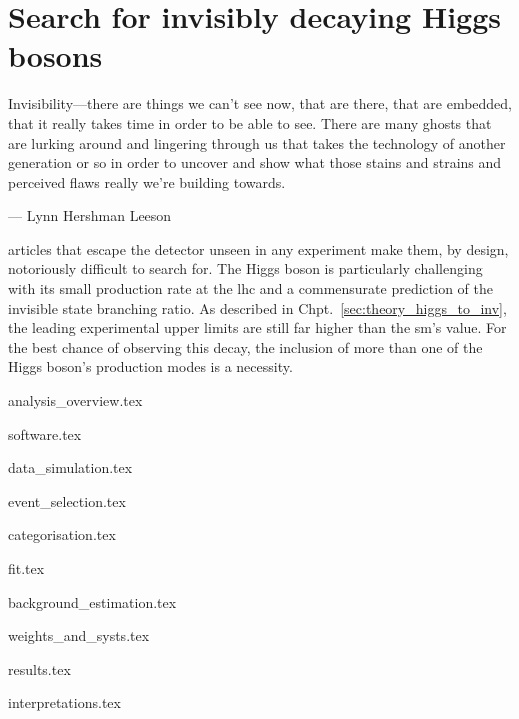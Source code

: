 \chapter{Search for invisibly decaying Higgs bosons}
\label{chap:higgstoinv}

\epigraph{Invisibility---there are things we can't see now, that are there, that are embedded, that it really takes time in order to be able to see. There are many ghosts that are lurking around and lingering through us that takes the technology of another generation or so in order to uncover and show what those stains and strains and perceived flaws really we're building towards.}{--- Lynn Hershman Leeson}

articles that escape the detector unseen in any experiment make them, by design, notoriously difficult to search for. The Higgs boson is particularly challenging with its small production rate at the \acrshort{lhc} and a commensurate prediction of the invisible state branching ratio. As described in Chpt.~\ref{sec:theory_higgs_to_inv}, the leading experimental upper limits are still far higher than the \acrlong{sm}'s value. For the best chance of observing this decay, the inclusion of more than one of the Higgs boson's production modes is a necessity.




{analysis_overview.tex}




{software.tex}




{data_simulation.tex}




{event_selection.tex}




{categorisation.tex}




{fit.tex}




{background_estimation.tex}




{weights_and_systs.tex}




{results.tex}




{interpretations.tex}
